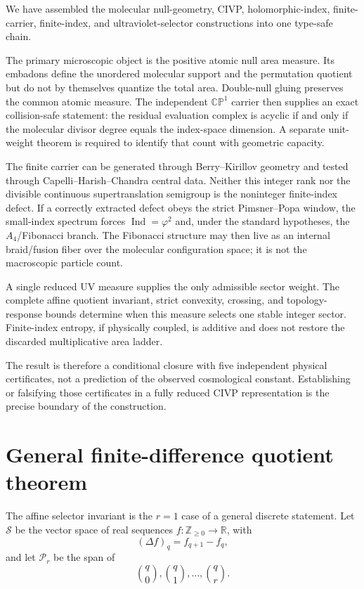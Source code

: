 \documentclass[aps,prd,preprint,nofootinbib,superscriptaddress]{revtex4-2}
\theoremstyle{definition}
\theoremstyle{remark}
\newcommand{\Ind}{\operatorname{Ind}}
\newcommand{\CP}{\mathbb{CP}}
\begin{document}
We have assembled the molecular null-geometry, CIVP, holomorphic-index,
finite-carrier, finite-index, and ultraviolet-selector constructions into one
type-safe chain.

The primary microscopic object is the positive atomic null area measure.  Its
embadons define the unordered molecular support and the permutation quotient
but do not by themselves quantize the total area.  Double-null gluing preserves
the common atomic measure.  The independent $\CP^1$ carrier then supplies an
exact collision-safe statement: the residual evaluation complex is acyclic
if and only if the molecular divisor degree equals the index-space dimension.
A separate unit-weight theorem is required to identify that count with
geometric capacity.

The finite carrier can be generated through Berry--Kirillov geometry and
tested through Capelli--Harish--Chandra central data.  Neither this integer
rank nor the divisible continuous supertranslation semigroup is the
noninteger finite-index defect.  If a correctly extracted defect obeys the
strict Pimsner--Popa window, the small-index spectrum forces
$\Ind=\varphi^2$ and, under the standard hypotheses, the $A_4$/Fibonacci
branch.  The Fibonacci structure may then live as an internal braid/fusion
fiber over the molecular configuration space; it is not the macroscopic
particle count.

A single reduced UV measure supplies the only admissible sector weight.  The
complete affine quotient invariant, strict convexity, crossing, and
topology-response bounds determine when this measure selects one stable
integer sector.  Finite-index entropy, if physically coupled, is additive and
does not restore the discarded multiplicative area ladder.

The result is therefore a conditional closure with five independent physical
certificates, not a prediction of the observed cosmological constant.
Establishing or falsifying those certificates in a fully reduced CIVP
representation is the precise boundary of the construction.


\appendix

\section{General finite-difference quotient theorem}
\label{app:differences}

The affine selector invariant is the $r=1$ case of a general discrete
statement.  Let $\mathcal S$ be the vector space of real sequences
$f:\mathbb Z_{\ge0}\to\mathbb R$, with
\begin{equation}
(\Delta f)_q=f_{q+1}-f_q,
\end{equation}
and let $\mathcal P_r$ be the span of
\begin{equation}
\binom q0,\binom q1,\ldots,\binom qr.
\end{equation}
\end{document}
